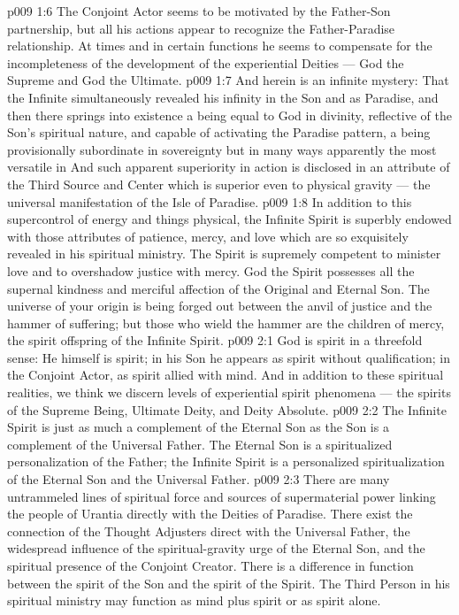 \vs p009 1:6 The Conjoint Actor seems to be motivated by the Father\hyp{}Son partnership, but all his actions appear to recognize the Father\hyp{}Paradise relationship. At times and in certain functions he seems to compensate for the incompleteness of the development of the experiential Deities --- God the Supreme and God the Ultimate.
\vs p009 1:7 \pc And herein is an infinite mystery: That the Infinite simultaneously revealed his infinity in the Son and as Paradise, and then there springs into existence a being equal to God in divinity, reflective of the Son’s spiritual nature, and capable of activating the Paradise pattern, a being provisionally subordinate in sovereignty but in many ways apparently the most versatile in  And such apparent superiority in action is disclosed in an attribute of the Third Source and Center which is superior even to physical gravity --- the universal manifestation of the Isle of Paradise.
\vs p009 1:8 In addition to this supercontrol of energy and things physical, the Infinite Spirit is superbly endowed with those attributes of patience, mercy, and love which are so exquisitely revealed in his spiritual ministry. The Spirit is supremely competent to minister love and to overshadow justice with mercy. God the Spirit possesses all the supernal kindness and merciful affection of the Original and Eternal Son. The universe of your origin is being forged out between the anvil of justice and the hammer of suffering; but those who wield the hammer are the children of mercy, the spirit offspring of the Infinite Spirit.
\vs p009 2:1 God is spirit in a threefold sense: He himself is spirit; in his Son he appears as spirit without qualification; in the Conjoint Actor, as spirit allied with mind. And in addition to these spiritual realities, we think we discern levels of experiential spirit phenomena --- the spirits of the Supreme Being, Ultimate Deity, and Deity Absolute.
\vs p009 2:2 The Infinite Spirit is just as much a complement of the Eternal Son as the Son is a complement of the Universal Father. The Eternal Son is a spiritualized personalization of the Father; the Infinite Spirit is a personalized spiritualization of the Eternal Son and the Universal Father.
\vs p009 2:3 There are many untrammeled lines of spiritual force and sources of supermaterial power linking the people of Urantia directly with the Deities of Paradise. There exist the connection of the Thought Adjusters direct with the Universal Father, the widespread influence of the spiritual\hyp{}gravity urge of the Eternal Son, and the spiritual presence of the Conjoint Creator. There is a difference in function between the spirit of the Son and the spirit of the Spirit. The Third Person in his spiritual ministry may function as mind plus spirit or as spirit alone.
